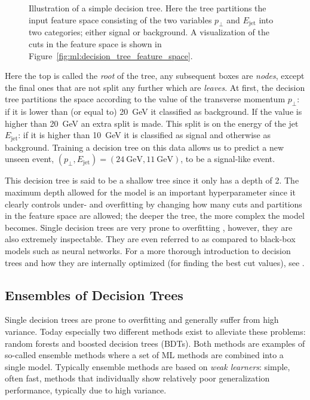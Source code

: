 \begin{figure}
  \centering
  \caption[Decision Tree]{
    Illustration of a simple decision tree. Here the tree partitions the input feature space consisting of the two variables $p_\perp$ and $E_\mathrm{jet}$ into two categories; either signal or background. A visualization of the cuts in the feature space is shown in Figure~\ref{fig:ml:decision_tree_feature_space}.
  }
  \label{fig:ml:decision_tree}
\end{figure}
Here the top  is called the \emph{root} of the tree, any subsequent boxes are \emph{nodes}, except the final ones that are not split any further which are \emph{leaves}. At first, the decision tree partitions the space according to the value of the transverse momentum $p_\perp$: if it is lower than (or equal to) \SI{20}{\GeV} it classified as background. If the value is higher than \SI{20}{\GeV} an extra split is made. This split is on the energy of the jet $E_\mathrm{jet}$: if it is higher than \SI{10}{\GeV} it is classified as signal and otherwise as background. Training a decision tree on this data allows us to predict a new unseen event, $(p_\perp, E_\mathrm{jet}) = (\SI{24}{\GeV},\SI{11}{\GeV})$, to be a signal-like event. 

This decision tree is said to be a shallow tree since it only has a depth of \num{2}. The maximum depth allowed for the model is an important hyperparameter since it clearly controls under- and overfitting by changing how many cuts and partitions in the feature space are allowed; the deeper the tree, the more complex the model becomes. Single decision trees are very prone to overfitting
, however, they are also extremely inspectable. They are even referred to as  compared to black-box models such as neural networks. For a more thorough introduction to decision trees and how they are internally optimized (for finding the best cut values), see \citet{hastieElementsStatisticalLearning2009}. 

\subsection{Ensembles of Decision Trees}
\label{subsec:ml:multiple_decision_trees}
Single decision trees are prone to overfitting and generally suffer from high variance. Today especially two different methods exist to alleviate these problems: random forests and boosted decision trees (BDTs). Both methods are examples of so-called ensemble methods where a set of ML methods are combined into a single model. Typically ensemble methods are based on \emph{weak learners}: simple, often fast, methods that individually show relatively poor generalization performance, typically due to high variance. 

